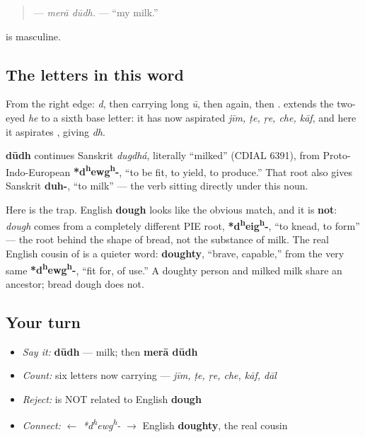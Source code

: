 \begin{quote}
\textbf{ } — \emph{merā dūdh.} — \textquotedblleft{}my milk.\textquotedblright{}
\end{quote}

\textbf{} is masculine.

\subsection*{The letters in this word}
From the right edge: \textbf{} \emph{d}, then \textbf{} carrying long \emph{ū}, then \textbf{} again, then \textbf{}. \textbf{} extends the two-eyed \emph{he} to a sixth base letter: it has now aspirated \emph{jīm, ṭe, ṛe, che, kāf}, and here it aspirates \textbf{}, giving \emph{dh}.

\begin{cousinweb}
\textbf{dūdh} continues Sanskrit \emph{dugdhá}, literally \textquotedblleft{}milked\textquotedblright{} (CDIAL 6391), from Proto-Indo-European \textbf{*d\textsuperscript{h}ewg\textsuperscript{h}-}, \textquotedblleft{}to be fit, to yield, to produce.\textquotedblright{} That root also gives Sanskrit \textbf{duh-}, \textquotedblleft{}to milk\textquotedblright{} — the verb sitting directly under this noun.

Here is the trap. English \textbf{dough} looks like the obvious match, and it is \textbf{not}: \emph{dough} comes from a completely different PIE root, \textbf{*d\textsuperscript{h}eig\textsuperscript{h}-}, \textquotedblleft{}to knead, to form\textquotedblright{} — the root behind the shape of bread, not the substance of milk. The real English cousin of \textbf{} is a quieter word: \textbf{doughty}, \textquotedblleft{}brave, capable,\textquotedblright{} from the very same \textbf{*d\textsuperscript{h}ewg\textsuperscript{h}-}, \textquotedblleft{}fit for, of use.\textquotedblright{} A doughty person and milked milk share an ancestor; bread dough does not.
\end{cousinweb}

\subsection*{Your turn}
\begin{itemize}
\raggedright
  \item \emph{Say it:} \textbf{dūdh} — milk; then \textbf{merā dūdh}
  \item \emph{Count:} six letters now carrying \textbf{} — \emph{jīm, ṭe, ṛe, che, kāf, dāl}
  \item \emph{Reject:} \textbf{} is NOT related to English \textbf{dough}
  \item \emph{Connect:} \textbf{} $\leftarrow$ \emph{*d\textsuperscript{h}ewg\textsuperscript{h}-} $\to$ English \textbf{doughty}, the real cousin
\end{itemize}

